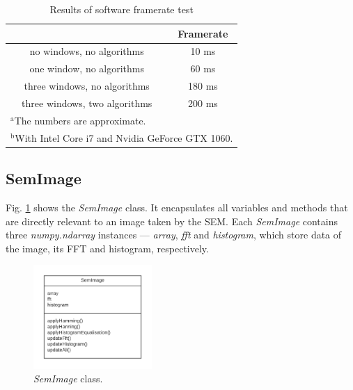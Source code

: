 \documentclass[conference]{IEEEtran}
\begin{document}
\begin{table}[htbp]
    \caption{Results of software framerate test}
    \begin{center}
    \begin{tabular}{|c|c|}
    \hline
     & \textbf{Framerate} \\
    \hline
    no windows, no algorithms & 10 ms \\
    \hline
    one window, no algorithms & 60 ms \\
    \hline
    three windows, no algorithms & 180 ms \\
    \hline
    three windows, two algorithms & 200 ms \\
    \hline
    \multicolumn{2}{l}{$^{\mathrm{a}}$The numbers are approximate.} \\
    \multicolumn{2}{l}{$^{\mathrm{b}}$With Intel Core i7 and Nvidia GeForce GTX 1060.}
    \end{tabular}
    \label{Software framerates}
    \end{center}
\end{table}

\subsection{SemImage}
Fig. \ref{Software SemImage} shows the \textit{SemImage} class. It encapsulates all variables and methods that are directly relevant to an image taken by the SEM. Each \textit{SemImage} contains three \textit{numpy.ndarray} instances --- \textit{array}, \textit{fft} and \textit{histogram}, which store data of the image, its FFT and histogram, respectively.

\begin{figure}[htbp]
    \centering
    \includegraphics[width=0.4\textwidth]{Images/Software SemImage.png}
    \caption{\textit{SemImage} class.}
    \label{Software SemImage}
\end{figure}
\end{document}
